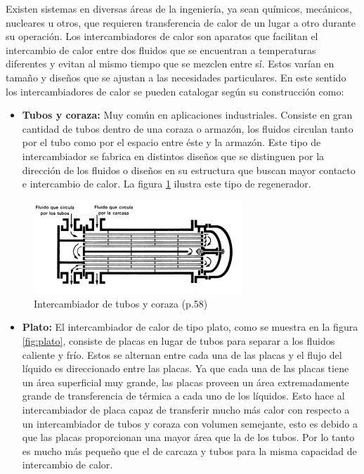 \documentclass[12pt,letterpaper]{article}     %
\begin{document}
Existen sistemas en diversas áreas de la ingeniería, ya sean químicos, mecánicos, nucleares u otros, que requieren transferencia de calor de un lugar a otro durante su operación.  Los intercambiadores de calor son aparatos que facilitan el intercambio de calor entre dos fluidos que se encuentran a temperaturas diferentes y evitan al mismo tiempo que se mezclen entre sí.  \cite[p.\ 269]{Cengel}
Estos varían en tamaño y diseños que se ajustan a las necesidades particulares.
En este sentido los intercambiadores de calor se pueden catalogar según su construcción como:


\begin{itemize}
\item \textbf{Tubos y coraza:} Muy común en aplicaciones industriales. Consiste en gran cantidad de tubos dentro de una coraza o armazón, los fluidos circulan tanto por el tubo como por el espacio entre éste y la armazón. Este tipo de intercambiador se fabrica en distintos diseños que se distinguen por la dirección de los fluidos o diseños en su estructura que buscan mayor contacto e intercambio de calor. La figura \ref{fig:coraza} ilustra este tipo de regenerador.
\end{itemize}


\begin{figure}[H]
\centering
\includegraphics[width=0.7\textwidth]{coraza.jpg}
\caption{Intercambiador de tubos y coraza \cite{Lopez} (p.58)}
\label{fig:coraza}
\end{figure}

\begin{itemize}
\item \textbf{Plato:} El intercambiador de calor de tipo plato, como se muestra en la figura \ref{fig:plato}, consiste de placas en lugar de tubos para separar a los fluidos caliente y frío. Estos se alternan entre cada una de las placas y  el flujo del líquido es direccionado entre las placas. Ya que cada una de las placas tiene un área superficial muy grande, las placas proveen un área extremadamente grande de transferencia de térmica a cada uno de los líquidos. Esto hace al intercambiador de placa capaz de transferir mucho más calor con respecto a un intercambiador de tubos y coraza con volumen semejante, esto es debido a que las placas proporcionan una mayor área que la de los tubos. Por lo tanto es mucho más pequeño que el de carcaza y tubos para la misma capacidad de intercambio de calor.\textbf{}
\end{itemize}
\end{document}
